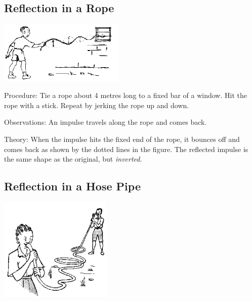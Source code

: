 \begin{multicols}{2}
\columnbreak

\subsection{Reflection in a Rope}

\begin{center}
\includegraphics[width=0.45\textwidth]{./img/source/reflection-rope-waves-2.png}
\end{center}

\begin{description*}
\item[Procedure:]{Tie a rope about 4 metres long to a fixed bar of a window. Hit the rope with a stick. Repeat by jerking the rope up and down.}
\item[Observations:]{An impulse travels along the rope and comes back.}
\item[Theory:]{When the impulse hits the fixed end of the rope, it bounces off and comes back as shown by the dotted lines in the figure. The reflected impulse is the same shape as the original, but \emph{inverted}.}
\end{description*}

\subsection{Reflection in a Hose Pipe}

\begin{center}
\includegraphics[width=0.4\textwidth]{./img/source/reflection-hose-waves.png}
\end{center}


\end{multicols}

